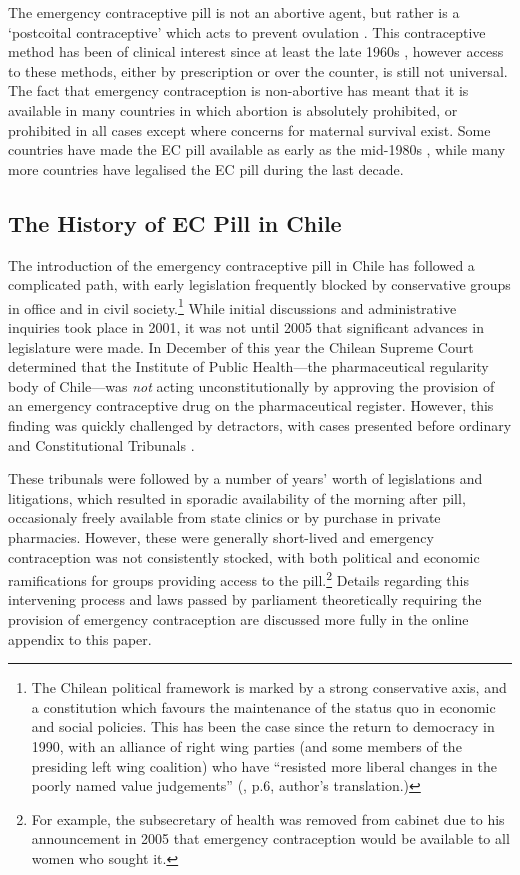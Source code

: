 The emergency contraceptive pill is not an abortive agent, but rather is a 
`postcoital contraceptive' which acts to prevent ovulation 
\citep{Novikovaetal2007, Noeetal2011}. This contraceptive method has been of 
clinical interest since at least the late 1960s \citep{Demers1971}, however 
access to these methods, either by prescription or over the counter, is still 
not universal.  The fact that emergency contraception is non-abortive has 
meant that it is available in many countries in which abortion is absolutely 
prohibited, or prohibited in all cases except where concerns for maternal 
survival exist.  Some countries have made the EC pill available as early as 
the mid-1980s \citep{UKFPA2006}, while many more countries have legalised 
the EC pill during the last decade.

\subsection{The History of EC Pill in Chile}
\label{TEENsscn:Chile}
The introduction of the emergency contraceptive pill in Chile has followed 
a complicated path, with early legislation frequently blocked by conservative 
groups in office and in civil society.\footnote{The Chilean political 
framework is marked by a strong conservative axis, and a constitution which 
favours the maintenance of the status quo in economic and social policies.  
This has been the case since the return to democracy in 1990, with an 
alliance of right wing parties (and some members of the presiding left wing 
coalition) who have ``resisted more liberal changes in the poorly named value 
judgements''  (\citet{CasasBecerra2008}, p.6, author's translation.)}  While 
initial discussions and administrative inquiries took place in 2001, it was 
not until 2005 that significant advances in legislature were made. In 
December of this year the Chilean Supreme Court determined that the Institute 
of Public Health---the pharmaceutical regularity body of Chile---was 
\emph{not} acting unconstitutionally by approving the provision of an 
emergency contraceptive drug on the pharmaceutical register.  However, this 
finding was quickly challenged by detractors, with cases presented before 
ordinary and Constitutional Tribunals \citep{CasasBecerra2008}.

These tribunals were followed by a number of years' worth of legislations and
litigations, which resulted in sporadic availability of the morning
after pill, occasionaly freely available from state clinics or by purchase in
private pharmacies.  However, these were generally short-lived and emergency
contraception was not consistently stocked, with both political and economic 
ramifications for groups providing access to the pill.\footnote{For example,
the subsecretary of health was removed from cabinet due to his announcement
in 2005 that emergency contraception would be available to all women who sought
it.}  Details regarding this intervening process and laws passed by parliament
theoretically requiring the provision of emergency contraception are discussed 
more fully in the online appendix to this paper.

